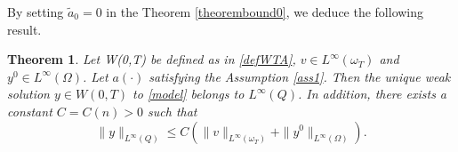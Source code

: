 \documentclass[reqno,twoside]{amsart}
\numberwithin{equation}{section}
\newtheorem{theorem}{Theorem}[section]
\theoremstyle{definition}
\numberwithin{equation}{section}
\def \dis {\displaystyle}
\def \dx{\mathrm{d}x}
\begin{document}
By setting $\tilde{a}_0=0$ in the Theorem \ref{theorembound0}, we deduce the following result.
\begin{theorem}\label{theorembound}Let W(0,T) be defined as in \eqref{defWTA}, $v\in L^\infty(\omega_T)$ and $y^{0}\in L^\infty(\Omega)$. Let $a(\cdot)$ satisfying the Assumption \ref{ass1}.  Then the unique weak solution $y \in W(0,T)$ to \eqref{model} belongs to $L^\infty(Q)$.
	In addition, there exists a constant $C=C(n)>0$ such that
	\begin{equation}\label{estimationbound}
		\|y\|_{L^\infty(Q)} \leq C\left(\|v\|_{L^\infty(\omega_T)}+\|y^0\|_{L^\infty(\Omega)}\right).
	\end{equation}
\end{theorem}
\end{document}
